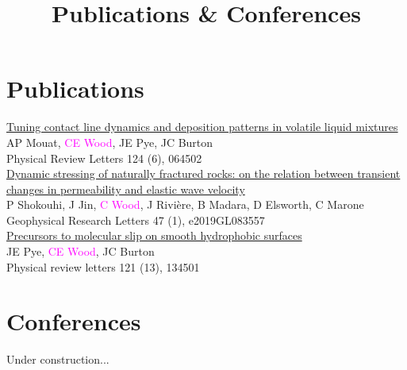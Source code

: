 \documentclass{article}
\title{Publications \& Conferences}
\author{}
\date{}
\begin{document}
	
\begin{mdframed}[
	backgroundcolor=black!10,linecolor=white,linewidth=2pt,%
	frametitlerule=true,%
	frametitlerulecolor=white,
	frametitlerulewidth=3.25pt, innertopmargin=\topskip,
	outerlinewidth=1.25pt
	]
	\maketitle	

\end{mdframed}
	
\bigskip \bigskip

\section*{Publications}
\href{https://arxiv.org/pdf/1905.11211.pdf}{Tuning contact line dynamics and deposition patterns in volatile liquid mixtures} \\
AP Mouat, \textcolor{magenta}{CE Wood}, JE Pye, JC Burton\\
Physical Review Letters 124 (6), 064502 \\ 

\noindent \href{https://agupubs.onlinelibrary.wiley.com/doi/abs/10.1029/2019GL083557}{Dynamic stressing of naturally fractured rocks: on the relation between transient changes in permeability and elastic wave velocity}\\
P Shokouhi, J Jin, \textcolor{magenta}{C Wood}, J Rivière, B Madara, D Elsworth, C Marone\\
Geophysical Research Letters 47 (1), e2019GL083557\\

\noindent \href{https://arxiv.org/pdf/1803.09095.pdf}{Precursors to molecular slip on smooth hydrophobic surfaces}\\
JE Pye, \textcolor{magenta}{CE Wood}, JC Burton\\
Physical review letters 121 (13), 134501\\


\section*{Conferences}

Under construction...\\
\end{document}
